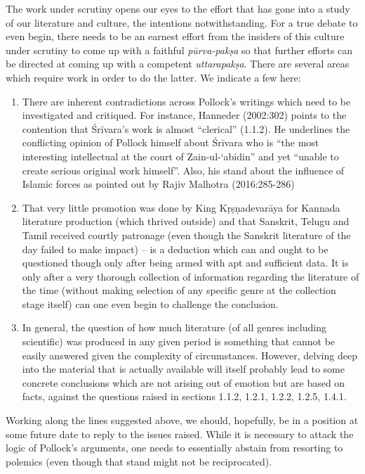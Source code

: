 The work under scrutiny opens our eyes to the effort that has gone into a study of our literature and culture, the intentions notwithstanding. For a true debate to even begin, there needs to be an earnest effort from the insiders of this culture under scrutiny to come up with a faithful {\sl pūrva-pakṣa} so that further efforts can be directed at coming up with a competent {\sl uttarapakṣa}. There are several areas which require work in order to do the latter. We indicate a few here:
\renewcommand\theenumi{\alph{enumi}}
\renewcommand\labelenumi{(\theenumi)}
\begin{enumerate}
\item There are inherent contradictions across Pollock's writings which need to be investigated and critiqued. For instance, Hanneder (2002:302) points to the contention that Śrīvara’s work is almost “clerical” (1.1.2). He underlines the conflicting opinion of Pollock himself about Śrīvara who is “the most interesting intellectual at the court of Zain-ul-‘abidin” and yet “unable to create serious original work himself”. Also, his stand about the influence of Islamic forces as pointed out by Rajiv Malhotra (2016:285-286)
\item That very little promotion was done by King Kṛṣṇadevarāya for Kannada literature production (which thrived outside) and that Sanskrit, Telugu and Tamil received courtly patronage (even though the Sanskrit literature of the day failed to make impact) – is a deduction which can and ought to be questioned though only after being armed with apt and sufficient data. It is only after a very thorough collection of information regarding the literature of the time (without making selection of any specific genre at the collection stage itself) can one even begin to challenge the conclusion.
\item In general, the question of how much literature (of all genres including scientific) was produced in any given period is something that cannot be easily answered given the complexity of circumstances. However, delving deep into the material that is actually available will itself probably lead to some concrete conclusions which are not arising out of emotion but are based on facts, against the questions raised in sections 1.1.2, 1.2.1, 1.2.2, 1.2.5,  1.4.1.
\end{enumerate}

Working along the lines suggested above, we should, hopefully, be in a position at some future date to reply to the issues raised. While it is necessary to attack the logic of Pollock’s arguments, one needs to essentially abstain from resorting to polemics (even though that stand might not be reciprocated). 

